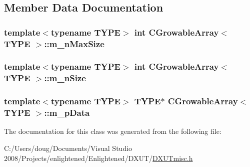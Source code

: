 \subsection{Member Data Documentation}
\hypertarget{class_c_growable_array_a8fe1ea6b03bbb8a0dca92c4fb7046c5d}{
\subsubsection[{m\_\-nMaxSize}]{\setlength{\rightskip}{0pt plus 5cm}template$<$typename TYPE$>$ {\bf int} {\bf CGrowableArray}$<$ TYPE $>$::{\bf m\_\-nMaxSize}}}
\label{class_c_growable_array_a8fe1ea6b03bbb8a0dca92c4fb7046c5d}
\hypertarget{class_c_growable_array_a6ae5d526df0f65163cae53792a6c9616}{
\subsubsection[{m\_\-nSize}]{\setlength{\rightskip}{0pt plus 5cm}template$<$typename TYPE$>$ {\bf int} {\bf CGrowableArray}$<$ TYPE $>$::{\bf m\_\-nSize}}}
\label{class_c_growable_array_a6ae5d526df0f65163cae53792a6c9616}
\hypertarget{class_c_growable_array_aae806f24201f88709a0c241f0f832cf4}{
\subsubsection[{m\_\-pData}]{\setlength{\rightskip}{0pt plus 5cm}template$<$typename TYPE$>$ TYPE$\ast$ {\bf CGrowableArray}$<$ TYPE $>$::{\bf m\_\-pData}}}
\label{class_c_growable_array_aae806f24201f88709a0c241f0f832cf4}


The documentation for this class was generated from the following file:\begin{DoxyCompactItemize}
\item 
C:/Users/doug/Documents/Visual Studio 2008/Projects/enlightened/Enlightened/DXUT/\hyperlink{_d_x_u_tmisc_8h}{DXUTmisc.h}\end{DoxyCompactItemize}
